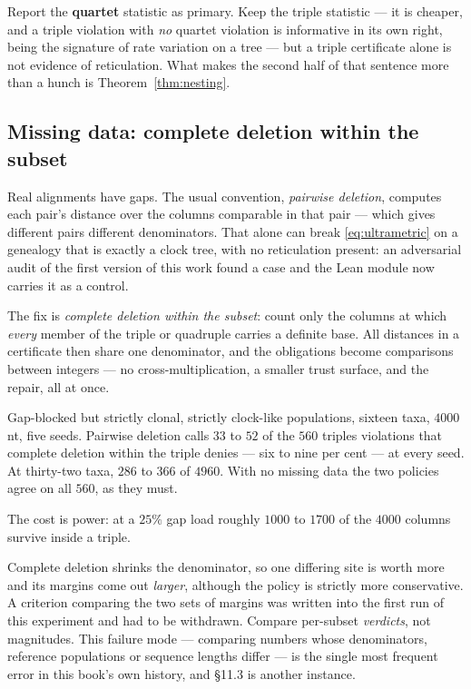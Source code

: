 \begin{remark}
Report the \textbf{quartet} statistic as primary. Keep the triple statistic ---
it is cheaper, and a triple violation with \emph{no} quartet violation is
informative in its own right, being the signature of rate variation on a tree
--- but a triple certificate alone is not evidence of reticulation. What makes
the second half of that sentence more than a hunch is
Theorem~\ref{thm:nesting}.
\end{remark}

\subsection{Missing data: complete deletion within the subset}\label{sub:deletion}

Real alignments have gaps. The usual convention, \emph{pairwise deletion},
computes each pair's distance over the columns comparable in that pair --- which
gives different pairs different denominators. That alone can break
\eqref{eq:ultrametric} on a genealogy that is exactly a clock tree, with no
reticulation present: an adversarial audit of the first version of this work
found a case and the Lean module now carries it as a control.

The fix is \emph{complete deletion within the subset}: count only the columns at
which \emph{every} member of the triple or quadruple carries a definite base.
All distances in a certificate then share one denominator, and the obligations
become comparisons between integers --- no cross-multiplication, a smaller
trust surface, and the repair, all at once.

\begin{numerics}
Gap-blocked but strictly clonal, strictly clock-like populations, sixteen taxa,
$4000$ nt, five seeds. Pairwise deletion calls $33$ to $52$ of the $560$ triples
violations that complete deletion within the triple denies --- six to nine per
cent --- at every seed. At thirty-two taxa, $286$ to $366$ of $4960$. With no
missing data the two policies agree on all $560$, as they must.

The cost is power: at a $25\%$ gap load roughly $1000$ to $1700$ of the $4000$
columns survive inside a triple.
\end{numerics}

\begin{remark}\label{rem:denominators}
Complete deletion shrinks the denominator, so one differing site is worth more
and its margins come out \emph{larger}, although the policy is strictly more
conservative. A criterion comparing the two sets of margins was written into the
first run of this experiment and had to be withdrawn. Compare per-subset
\emph{verdicts}, not magnitudes. This failure mode --- comparing numbers whose
denominators, reference populations or sequence lengths differ --- is the single
most frequent error in this book's own history, and \S11.3 is another instance.
\end{remark}

